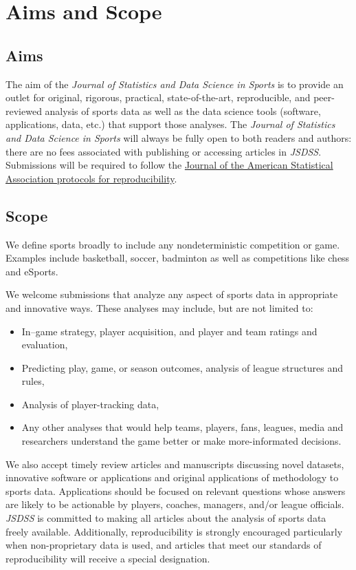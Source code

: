 \documentclass[
  12pt]{article}
\providecommand{\tightlist}{%
  \setlength{\itemsep}{0pt}\setlength{\parskip}{0pt}}
\begin{document}
\section{Aims and Scope}\label{aims-and-scope}

\subsection{Aims}\label{aims}

The aim of the \emph{Journal of Statistics and Data Science in Sports}
is to provide an outlet for original, rigorous, practical,
state-of-the-art, reproducible, and peer-reviewed analysis of sports
data as well as the data science tools (software, applications, data,
etc.) that support those analyses. The \emph{Journal of Statistics and
Data Science in Sports} will always be fully open to both readers and
authors: there are no fees associated with publishing or accessing
articles in \emph{JSDSS}.\\
Submissions will be required to follow the
\href{https://jasa-acs.github.io/repro-guide/}{Journal of the American
Statistical Association protocols for reproducibility}.

\subsection{Scope}\label{scope}

We define sports broadly to include any nondeterministic competition or
game. Examples include basketball, soccer, badminton as well as
competitions like chess and eSports.

We welcome submissions that analyze any aspect of sports data in
appropriate and innovative ways. These analyses may include, but are not
limited to:

\begin{itemize}
\tightlist
\item
  In--game strategy, player acquisition, and player and team ratings and
  evaluation,
\item
  Predicting play, game, or season outcomes, analysis of league
  structures and rules,
\item
  Analysis of player-tracking data,
\item
  Any other analyses that would help teams, players, fans, leagues,
  media and researchers understand the game better or make
  more-informated decisions.
\end{itemize}

We also accept timely review articles and manuscripts discussing novel
datasets, innovative software or applications and original applications
of methodology to sports data. Applications should be focused on
relevant questions whose answers are likely to be actionable by players,
coaches, managers, and/or league officials. \emph{JSDSS} is committed to
making all articles about the analysis of sports data freely available.
Additionally, reproducibility is strongly encouraged particularly when
non-proprietary data is used, and articles that meet our standards of
reproducibility will receive a special designation.
\end{document}
